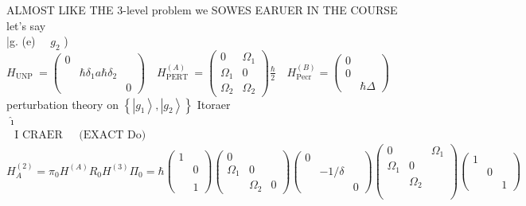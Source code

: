 \documentclass[10pt]{article}
\begin{document}
ALMOST LIKE THE 3-level problem we SOWES EARUER IN THE COURSE\\
let's say\\
|g. (e) $\quad g_{2}$ )\\
$H_{\text {UNP }}=\left(\begin{array}{ccc}0 & & \\ & \hbar \delta_{1} a \hbar \delta_{2} & \\ & & 0\end{array}\right) \quad H_{\text {PERT }}^{(A)}=\left(\begin{array}{cc}0 & \Omega_{1} \\ \Omega_{1} & 0 \\ \Omega_{2} & \Omega_{2}\end{array}\right) \frac{\hbar}{2} \quad H_{\text {Pecr }}^{(B)}=\left(\begin{array}{cc}0 & \\ 0 & \\ & \hbar \Delta\end{array}\right)$\\
perturbation theory on $\left\{\left|g_{1}\right\rangle,\left|g_{2}\right\rangle\right\}$ Itoraer\\
$\begin{array}{ll}\hat{\imath} & \\ \text { I CRAER } & \text { (EXACT Do) }\end{array}$\\
$H_{A}^{(2)}=\pi_{0} H^{(A)} R_{0} H^{(3)} \Pi_{0}=\hbar\left(\begin{array}{cc}1 & \\ & 0 \\ & \\ & 1\end{array}\right)\left(\begin{array}{ccc}0 & & \\ \Omega_{1} & 0 & \\ & \Omega_{2} & 0\end{array}\right)\left(\begin{array}{ccc}0 & & \\ & -1 / \delta & \\ & & 0\end{array}\right)\left(\begin{array}{ccc}0 & & \Omega_{1} \\ \Omega_{1} & 0 & \\ & \Omega_{2} & \\ & & \\ & & \end{array}\right)\left(\begin{array}{lll}1 & & \\ & 0 & \\ & & 1\end{array}\right)$\\
\end{document}
